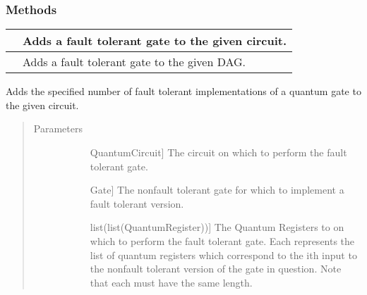 \documentclass[letterpaper,10pt,english]{sphinxmanual}
\begin{document}
\begin{fulllineitems}
\subsubsection*{Methods}


\begin{savenotes}\sphinxattablestart
\centering
\begin{tabulary}{\linewidth}[t]{|T|T|}
\hline

&
Adds a fault tolerant gate to the given circuit.
\\
\hline
{}
&
Adds a fault tolerant gate to the given DAG.
\\
\hline
\end{tabulary}
\par
\sphinxattableend\end{savenotes}

\begin{fulllineitems}
\label{\detokenize{Steane:Steane.SteaneFaultTolerantGates.addGateCircuit}}
Adds the specified number of fault tolerant implementations of a quantum gate to the given circuit.
\begin{quote}\begin{description}
\item[{Parameters}] \leavevmode\begin{description}
\item[{}] \leavevmode{[}QuantumCircuit{]}
The circuit on which to perform the fault tolerant gate.

\item[{}] \leavevmode{[}Gate{]}
The non\sphinxhyphen{}fault tolerant gate for which to implement a fault tolerant version.

\item[{}] \leavevmode{[}list(list(QuantumRegister)){]}
The Quantum Registers to on which to perform the fault tolerant gate. Each  represents the list of quantum registers which correspond to the ith input to the non\sphinxhyphen{}fault tolerant version of the gate in question. Note that each  must have the same length.


\end{description}
\end{description}
\end{quote}
\end{fulllineitems}
\end{fulllineitems}
\end{document}
